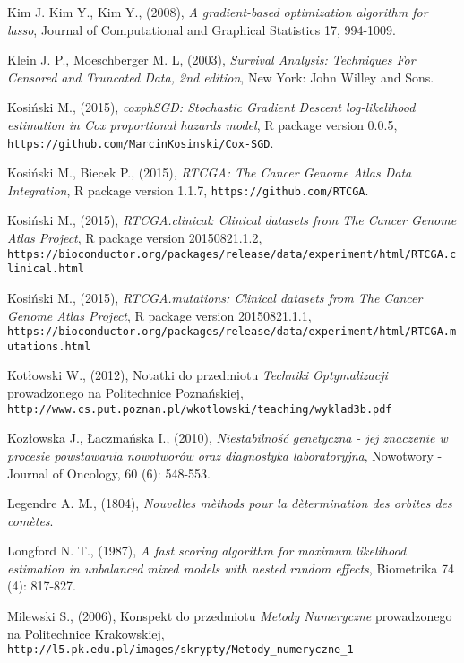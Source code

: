 \begin{thebibliography}{99}
 Kim J. Kim Y., Kim Y., (2008), \textit{A gradient-based optimization algorithm for lasso},  Journal of Computational and Graphical Statistics 17, 994-1009.

 Klein J. P., Moeschberger M. L, (2003), \textit{Survival Analysis: Techniques For Censored and Truncated Data, 2nd edition}, New York: John Willey and Sons.



 Kosiński M., (2015), \textit{coxphSGD: Stochastic Gradient Descent log-likelihood estimation in Cox proportional hazards model}, R package version 0.0.5,  \texttt{https://github.com/MarcinKosinski/Cox-SGD}.

 Kosiński M., Biecek P., (2015), \textit{RTCGA: The Cancer Genome Atlas Data Integration}, R package version 1.1.7, \texttt{https://github.com/RTCGA}.

 Kosiński M., (2015), \textit{RTCGA.clinical: Clinical datasets from The Cancer Genome Atlas Project}, R package version 20150821.1.2, \\ \texttt{https://bioconductor.org/packages/release/data/experiment/html/RTCGA.clinical.html}

 Kosiński M., (2015), \textit{RTCGA.mutations: Clinical datasets from The Cancer Genome Atlas Project}, R package version 20150821.1.1, \\ \texttt{https://bioconductor.org/packages/release/data/experiment/html/RTCGA.mutations.html}

 Kotłowski W., (2012), Notatki do przedmiotu \textit{Techniki Optymalizacji} prowadzonego na Politechnice Poznańskiej, \\ \texttt{http://www.cs.put.poznan.pl/wkotlowski/teaching/wyklad3b.pdf}

 Kozłowska J., Łaczmańska I., (2010), \textit{Niestabilność genetyczna - jej znaczenie w procesie powstawania nowotworów oraz diagnostyka laboratoryjna}, Nowotwory - Journal of Oncology, 60 (6): 548-553.

 Legendre A. M., (1804), \textit{Nouvelles m\`ethods pour la d\`etermination des orbites des com\`etes}.


 Longford N. T., (1987), \textit{A fast scoring algorithm for maximum likelihood estimation in unbalanced mixed models with nested random effects}, Biometrika 74 (4): 817-827.

 Milewski S., (2006), Konspekt do przedmiotu \textit{Metody Numeryczne} prowadzonego na Politechnice Krakowskiej, \\ \texttt{http://l5.pk.edu.pl/images/skrypty/Metody\_numeryczne\_1}


\end{thebibliography}
